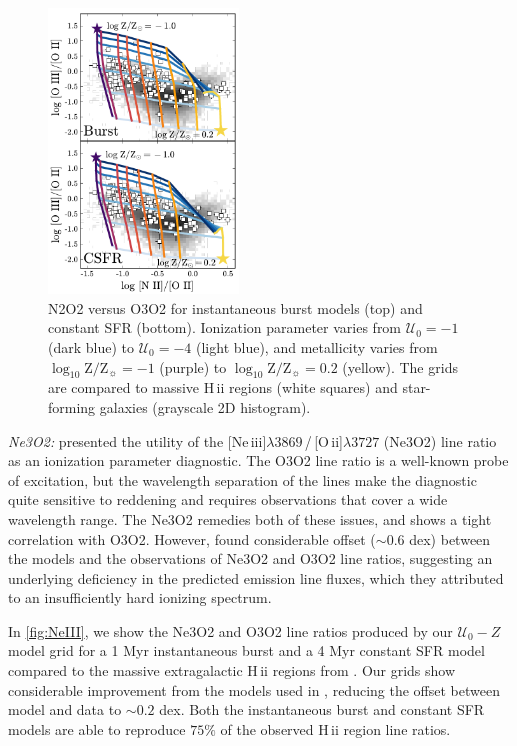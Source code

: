 \documentclass[linenumbers, tighten, trackchanges]{aastex61}%
\newcommand{\Fig}[1]{\autoref{fig:#1}}
\newcommand{\logten}{\ensuremath{\log_{10}}}
\newcommand{\oii}{[O\,{\sc ii}]\xspace}
\newcommand{\neiii}{[Ne\,{\sc iii}]\xspace}
\newcommand{\hii}{H\,{\sc ii}\xspace}
\newcommand\lam[1]{\ensuremath{\lambda #1}}
\newcommand{\logZeq}[1]{\ensuremath{\logten \mathrm{Z}/\mathrm{Z}_{\sun} = #1}}
\newcommand{\U}{\ensuremath{\mathcal{U}_{0}}}
\begin{document}
\begin{figure}[!htbp]
  \begin{centering}
    \includegraphics[width=0.45\textwidth]{f19.pdf}
    \caption{N2O2 versus O3O2 for instantaneous burst models (top) and constant SFR (bottom). Ionization parameter varies from $\U=-1$ (dark blue) to $\U=-4$ (light blue), and metallicity varies from \logZeq{-1} (purple) to \logZeq{0.2} (yellow). The grids are compared to massive \hii regions (white squares) and star-forming galaxies (grayscale 2D histogram).}
    \label{fig:NIIOII}
  \end{centering}
\end{figure}

{\it Ne3O2:} \citet{Levesque14} presented the utility of the \neiii\lam{3869}\,/\,\oii\lam{3727} (Ne3O2) line ratio as an ionization parameter diagnostic. The O3O2 line ratio is a well-known probe of excitation, but the wavelength separation of the lines make the diagnostic quite sensitive to reddening and requires observations that cover a wide wavelength range. The Ne3O2 remedies both of these issues, and shows a tight correlation with O3O2. However, \citet{Levesque14} found considerable offset (${\sim}0.6$ dex) between the models and the observations of Ne3O2 and O3O2 line ratios, suggesting an underlying deficiency in the predicted emission line fluxes, which they attributed to an insufficiently hard ionizing spectrum. 

In \Fig{NeIII}, we show the Ne3O2 and O3O2 line ratios produced by our $\U-Z$ model grid for a 1 Myr instantaneous burst and a 4 Myr constant SFR model compared to the massive extragalactic \hii regions from \citet{vanzee98}. Our grids show considerable improvement from the models used in \citet{Levesque14}, reducing the offset between model and data to $\sim 0.2$ dex. Both the instantaneous burst and constant SFR models are able to reproduce $75\%$ of the observed \hii region line ratios.
\end{document}
